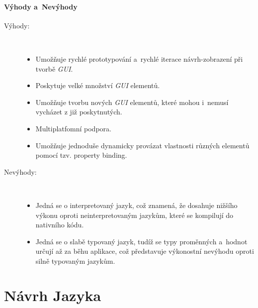 \documentclass[11pt,twoside,a4paper]{book}
\begin{document}
\subsubsection{Výhody a~Nevýhody}
\begin{description}
\item[Výhody:] ~
\begin{itemize}
  \item Umožňuje rychlé prototypování a~rychlé iterace návrh-zobrazení při tvorbě \textit{GUI}.
  \item Poskytuje velké množství \textit{GUI} elementů.
  \item Umožňuje tvorbu nových \textit{GUI} elementů, které mohou i~nemusí vycházet z již poskytnutých.
  \item Multiplatfomní podpora.
  \item Umožňuje jednoduše dynamicky provázat vlastnosti různých elementů pomocí tzv. property binding.
\end{itemize}
\item[Nevýhody:] ~
\begin{itemize}
  \item Jedná se o interpretovaný jazyk, což znamená, že dosahuje nižšího výkonu oproti neinterpretovaným jazykům, které se kompilují do nativního kódu.
  \item Jedná se o slabě typovaný jazyk, tudíž se typy proměnných a~hodnot určují až za běhu aplikace, což představuje výkonostní nevýhodu oproti silně typovaným jazykům.
\end{itemize}
\end{description}







\chapter{\label{CH:CQMLDes}Návrh Jazyka}
\end{document}
